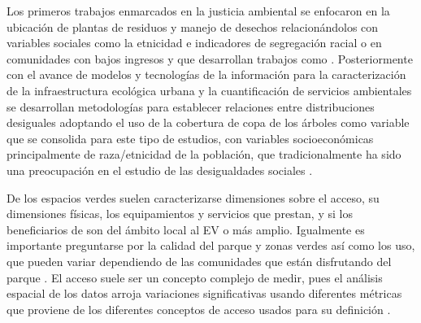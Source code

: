 \documentclass[12pt,]{book}
\begin{document}
Los primeros trabajos enmarcados en la justicia ambiental se enfocaron
en la ubicación de plantas de residuos y manejo de desechos
relacionándolos con variables sociales como la etnicidad e indicadores
de segregación racial o en comunidades con bajos ingresos
\citep{heynen_political_2006}y que desarrollan trabajos como
\citep{chakraborty1997exploring, cutter_role_1996}. Posteriormente con
el avance de modelos y tecnologías de la información para la
caracterización de la infraestructura ecológica urbana y la
cuantificación de servicios ambientales se desarrollan metodologías para
establecer relaciones entre distribuciones desiguales adoptando el uso
de la cobertura de copa de los árboles como variable que se consolida
para este tipo de estudios, con variables socioeconómicas principalmente
de raza/etnicidad de la población, que tradicionalmente ha sido una
preocupación en el estudio de las desigualdades sociales
\citep{heynen_political_2006, landry_street_2009, phelps_association_2012, zhou_social_2013, schwarz_trees_2015, watkins_is_2016}.

De los espacios verdes suelen caracterizarse dimensiones sobre el
acceso, su dimensiones físicas, los equipamientos y servicios que
prestan, y si los beneficiarios de son del ámbito local al EV o más
amplio. Igualmente es importante preguntarse por la calidad del parque y
zonas verdes así como los uso, que pueden variar dependiendo de las
comunidades que están disfrutando del parque \citep{kabisch_green_2014}.
El acceso suele ser un concepto complejo de medir, pues el análisis
espacial de los datos arroja variaciones significativas usando
diferentes métricas que proviene de los diferentes conceptos de acceso
usados para su definición \citep{talen_assessing_1998}.
\end{document}
